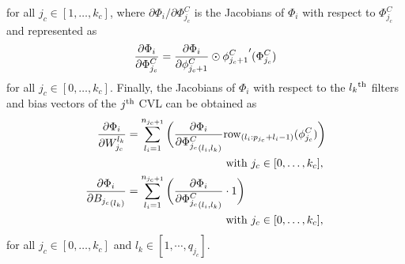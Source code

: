 \documentclass[letterpaper, 10 pt, conference]{ieeeconf}  %
\begin{document}
for all $j_c\in[1,\dots,k_c]$, where $\partial \Phi_i/\partial \Phi^C_{j_c}$ is the Jacobians of $\Phi_i$ with respect to $\Phi^C_{j_c}$ and represented as
\begin{equation}
    {\partial \Phi_i\over\partial {\Phi^C_{j_c}}} = {\partial {\Phi_i}\over\partial \phi^{C}_{j_c+1}}\odot{\phi^{C}_{j_c+1}}'({\Phi^C_{j_c}})
\end{equation}
for all $j_c\in[0,\dots,k_c]$.
Finally, the Jacobians of $\Phi_i$ with respect to the $l_k\textsuperscript{th}$ filters and bias vectors of the $j\textsuperscript{th}$ CVL can be obtained as
\begin{equation}
    \begin{aligned}
        {\partial \Phi_i\over\partial W^{l_k}_{j_c}} 
        &=
        \sum_{l_i=1}^{n_{j_c+1}}
        \bigg(
        {\partial \Phi_i\over\partial {\Phi^C_{j_c}}_{(l_i,l_k)}} 
            \text{row}_{(l_i:p_{j_c}+l_i-1)}(\phi^C_{j_c})
        \bigg)
        \\
         &\hspace{90pt}\text{with }j_c\in[0,\dots,k_c],\hfilneg\\        
        {\partial \Phi_i\over\partial {B_{j_c}}_{(l_k)}} &=
        \sum_{l_i=1}^{n_{j_c+1}} 
        \bigg(
            {\partial \Phi_i\over\partial {\Phi^C_{j_c}}_{(l_i,l_k)}} \cdot 1
        \bigg)
        \\
         &\hspace{90pt}\text{with }j_c\in[0,\dots,k_c],\hfilneg
    \end{aligned}
    \label{eq. dPhidOm}
\end{equation}
for all $j_c\in[0,\dots,k_c]$ and $l_k\in[1,\cdots,q_{j_c}]$.




\end{document}
